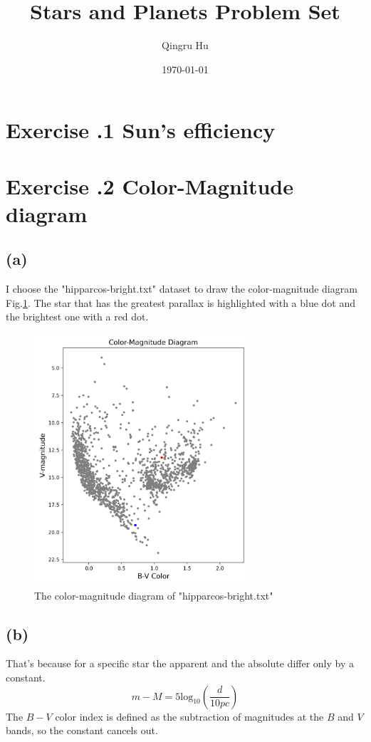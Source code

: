 \documentclass[a4paper,12pt]{article}
\title{Stars and Planets Problem Set \uppercase\expandafter{\romannumeral1}}
\author{Qingru Hu}
\date{\today}
\begin{document}
\maketitle

\section*{\textbf{Exercise \uppercase\expandafter{}.1 Sun's efficiency}}


\section*{\textbf{Exercise \uppercase\expandafter{}.2 Color-Magnitude diagram}}
\subsection*{(a)}
I choose the "hipparcos-bright.txt" dataset to draw the 
color-magnitude diagram Fig.\ref{fig1}. The star that has the greatest parallax is 
highlighted with a blue dot and the brightest one with a red dot.
\begin{figure}[htbp]
    \centering
    \includegraphics[width=8cm]{color_mag.png}
    \caption{The color-magnitude diagram of "hipparcos-bright.txt"}
    \label{fig1}
\end{figure}

\subsection*{(b)}
That's because for a specific star the apparent and the absolute 
differ only by a constant.
\begin{equation}
    m-M = 5 \text{log}_{10}(\frac{d}{10pc})
\end{equation}
The $B-V$ color index is defined as 
the subtraction of magnitudes at the $B$ and $V$ bands, so the constant 
cancels out.
\end{document}
